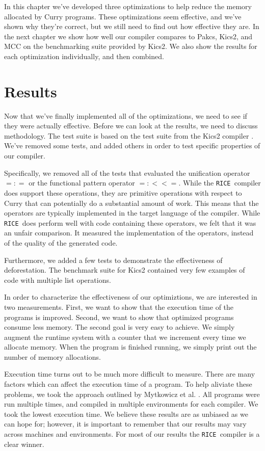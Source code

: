 \documentclass{book}
\newcommand{\cuUnify}{\mathbin{=\!\!:\!\!=}}
\newcommand{\cuFunPat}{\mathbin{=\!\!:\!\!<\!\!<\!\!=}}
\newcommand{\ricesp}{\texttt{RICE }}
\theoremstyle{definition}
\begin{document}
In this chapter we've developed three optimizations to help reduce the memory allocated by
Curry programs.
These optimizations seem effective, and we've shown why they're correct,
but we still need to find out how effective they are.
In the next chapter we show how well our compiler compares to 
Pakcs, Kics2, and MCC on the benchmarking suite provided by Kics2.
We also show the results for each optimization individually, and then combined.


\chapter{Results} \label{ch:Results}


Now that we've finally implemented all of the optimizations, we need
to see if they were actually effective.
Before we can look at the results, we need to discuss methodology.
The test suite is based on the test suite from the Kics2 compiler \cite{kics2}.
We've removed some tests, and added others in order to test specific properties
of our compiler.

Specifically, we removed all of the tests that evaluated the unification operator
\ensuremath{\cuUnify} or the functional pattern operator \ensuremath{\cuFunPat}.
While the \ricesp compiler does support these operations,
they are primitive operations with respect to Curry that can potentially
do a substantial amount of work.
This means that the operators are typically implemented in the target language
of the compiler.
While \ricesp does perform well with code containing these operators,
we felt that it was an unfair comparison.
It measured the implementation of the operators, instead of the quality of the generated code.

Furthermore, we added a few tests to demonstrate the effectiveness of deforestation.
The benchmark suite for Kics2 contained very few examples of code with multiple
list operations.

In order to characterize the effectiveness of our optimiztions,
we are interested in two measurements.
First, we want to show that the execution time of the programs is improved.
Second, we want to show that optimized programs consume less memory.
The second goal is very easy to achieve.
We simply augment the runtime system with a counter that we increment
every time we allocate memory.
When the program is finished running, we simply print out the number of
memory allocations.

Execution time turns out to be much more difficult to measure.
There are many factors which can affect the execution time of a program.
To help aliviate these problems, we took the approach outlined by Mytkowicz et al. \cite{wrongData}.
All programs were run multiple times, and compiled in multiple environments
for each compiler.  We took the lowest execution time.
We believe these results are as unbiased as we can hope for;
however, it is important to remember that our results may vary across machines and environments.
For most of our results the \ricesp compiler is a clear winner.
\end{document}
